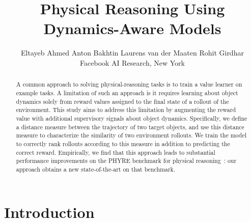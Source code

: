 \documentclass{article}
\title{Physical Reasoning Using Dynamics-Aware Models}
\author{
  Eltayeb Ahmed \quad Anton Bakhtin \quad Laurens van der Maaten \quad Rohit Girdhar \\
  Facebook AI Research, New York
}
\begin{document}
\maketitle

\begin{abstract}
A common approach to solving physical-reasoning tasks is to train a value learner on example tasks.
A limitation of such an approach is it requires learning about object dynamics solely from reward values assigned to the final state of a  rollout of the environment.
This study aims to address this limitation by augmenting the reward value with additional supervisory signals about object dynamics.
Specifically, we define a distance measure between the trajectory of two target objects, and use this distance measure to characterize the similarity of two environment rollouts.
We train the model to correctly rank rollouts according to this measure in addition to predicting the correct reward.
Empirically, we find that this approach leads to substantial performance improvements on the PHYRE benchmark for physical reasoning~\cite{bakhtin2019phyre}: our approach obtains a new state-of-the-art on that benchmark.
\end{abstract} \section{Introduction}
\label{sec:introduction}
\end{document}
